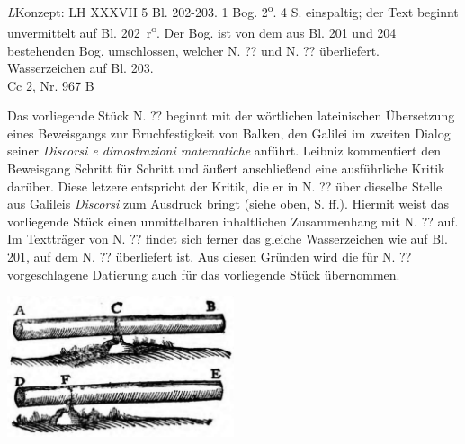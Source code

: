\begin{Ueberlieferung}%
{\textit{L}}Konzept: LH XXXVII 5 Bl. 202-203. 1 Bog. 2\textsuperscript{o}. 4 S. einspaltig;
der Text beginnt unver\-mittelt auf Bl. 202~r\textsuperscript{o}.
Der Bog. ist von dem aus Bl. 201 und 204 bestehenden Bog. um\-schlossen,
welcher N. ?? %
und N. ?? %
überliefert.
Wasserzeichen auf Bl. 203.\\
Cc 2, Nr. 967 B 
\end{Ueberlieferung}
\vspace*{8mm}
\begin{Datierungsgruende}%
Das vorliegende Stück N. ?? %
beginnt mit der wörtlichen lateinischen Übersetzung eines Beweisgangs zur Bruchfestigkeit von Balken, den Galilei\protect{} im zweiten Dialog seiner \textit{Discorsi e dimostrazioni matematiche} anführt.
Leibniz kommentiert den Beweisgang Schritt für Schritt und äußert anschließend eine ausführliche Kritik darüber.
Diese letzere entspricht der Kritik, die er in N. ?? %
über dieselbe Stelle aus Galileis \textit{Discorsi} zum Ausdruck bringt (siehe oben, S. \pageref{037,05_201}ff.). 
Hiermit weist das vorliegende Stück einen unmittelbaren inhalt\-lichen Zusammenhang mit N. ?? %
auf. Im Textträger von N. ?? %
findet sich ferner das gleiche Wasserzeichen wie auf Bl. 201,
auf dem N. ?? %
überliefert ist.
Aus diesen Gründen wird die für N. ?? %
vorgeschlagene Datierung auch für das vorliegende Stück übernommen. 
\end{Datierungsgruende}
%
\vspace*{1.5em}%
\pstartfirst%
\centering\includegraphics[width=0.5\textwidth]{images/Galilei_Opere_1556_Ausschn.pdf}\\
